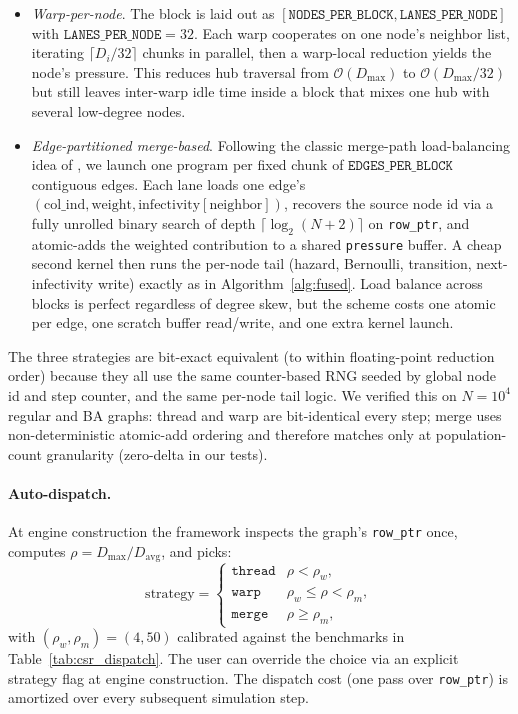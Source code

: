 \documentclass[a4paper,fleqn]{cas-sc}
\theoremstyle{definition}
\theoremstyle{remark}
\newcommand{\bigO}{\mathcal{O}}
\begin{document}
\begin{itemize}
\item \emph{Warp-per-node}. The block is laid out as $[\texttt{NODES\_PER\_BLOCK}, \texttt{LANES\_PER\_NODE}]$ with $\texttt{LANES\_PER\_NODE}=32$. Each warp cooperates on one node's neighbor list, iterating $\lceil D_i / 32\rceil$ chunks in parallel, then a warp-local reduction yields the node's pressure. This reduces hub traversal from $\bigO(D_{\max})$ to $\bigO(D_{\max}/32)$ but still leaves inter-warp idle time inside a block that mixes one hub with several low-degree nodes.
\item \emph{Edge-partitioned merge-based}. Following the classic merge-path load-balancing idea of \citet{merrill2016merge}, we launch one program per fixed chunk of $\texttt{EDGES\_PER\_BLOCK}$ contiguous edges. Each lane loads one edge's $(\text{col\_ind}, \text{weight}, \text{infectivity}[\text{neighbor}])$, recovers the source node id via a fully unrolled binary search of depth $\lceil \log_2(N+2)\rceil$ on \texttt{row\_ptr}, and atomic-adds the weighted contribution to a shared \texttt{pressure} buffer. A cheap second kernel then runs the per-node tail (hazard, Bernoulli, transition, next-infectivity write) exactly as in Algorithm~\ref{alg:fused}. Load balance across blocks is perfect regardless of degree skew, but the scheme costs one atomic per edge, one scratch buffer read/write, and one extra kernel launch.
\end{itemize}

The three strategies are bit-exact equivalent (to within floating-point reduction order) because they all use the same counter-based RNG seeded by global node id and step counter, and the same per-node tail logic. We verified this on $N=10^4$ regular and BA graphs: thread and warp are bit-identical every step; merge uses non-deterministic atomic-add ordering and therefore matches only at population-count granularity (zero-delta in our tests).

\paragraph{Auto-dispatch.} At engine construction the framework inspects the graph's \texttt{row\_ptr} once, computes $\rho = D_{\max}/D_{\mathrm{avg}}$, and picks:
\begin{equation*}
\text{strategy} = \begin{cases}
\texttt{thread} & \rho < \rho_w,\\
\texttt{warp}   & \rho_w \leq \rho < \rho_m,\\
\texttt{merge}  & \rho \geq \rho_m,
\end{cases}
\end{equation*}
with $(\rho_w, \rho_m) = (4, 50)$ calibrated against the benchmarks in Table~\ref{tab:csr_dispatch}. The user can override the choice via an explicit strategy flag at engine construction. The dispatch cost (one pass over \texttt{row\_ptr}) is amortized over every subsequent simulation step.
\end{document}
